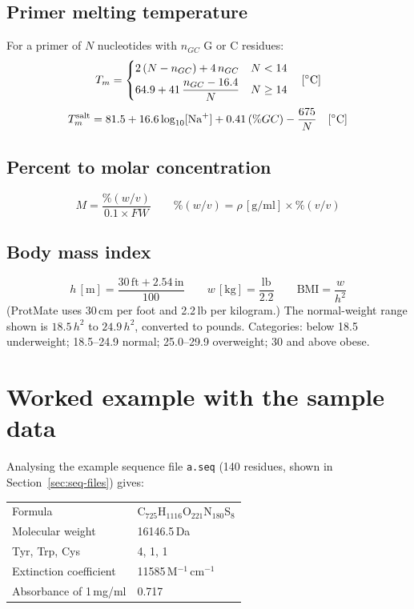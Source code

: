 \documentclass[11pt,a4paper,oneside]{report}
\newcommand{\cmd}[1]{\texttt{#1}}            %
\newcommand{\degC}{\ensuremath{^{\circ}}C}
\begin{document}
\section{Primer melting temperature}
For a primer of $N$ nucleotides with $n_{GC}$ G or C residues:
\[
  T_m = \begin{cases}
     2\,(N - n_{GC}) + 4\,n_{GC} & N < 14\\[2pt]
     64.9 + 41\,\dfrac{n_{GC} - 16.4}{N} & N \ge 14
  \end{cases}\quad[\text{\degC}]
\]
\[
  T_m^\text{salt} = 81.5 + 16.6\log_{10}[\text{Na}^+] + 0.41\,(\%GC) - \frac{675}{N}\quad[\text{\degC}]
\]

\section{Percent to molar concentration}
\[
  M = \frac{\%(w/v)}{0.1\times FW}
  \qquad
  \%(w/v) = \rho\,[\text{g/ml}]\times\%(v/v)
\]

\section{Body mass index}
\[
  h\,[\text{m}] = \frac{30\,\text{ft} + 2.54\,\text{in}}{100}
  \qquad
  w\,[\text{kg}] = \frac{\text{lb}}{2.2}
  \qquad
  \text{BMI} = \frac{w}{h^2}
\]
(ProtMate uses 30\,cm per foot and 2.2\,lb per kilogram.) The normal-weight range shown is
$18.5\,h^2$ to $24.9\,h^2$, converted to pounds. Categories: below 18.5 underweight; 18.5--24.9
normal; 25.0--29.9 overweight; 30 and above obese.

\chapter{Worked example with the sample data}

Analysing the example sequence file \cmd{a.seq} (140 residues,
shown in Section~\ref{sec:seq-files}) gives:

\begin{center}\small
\begin{tabular}{@{}ll@{}}
\toprule
Formula & C$_{725}$H$_{1116}$O$_{221}$N$_{180}$S$_{8}$ \\
Molecular weight & 16146.5\,Da \\
Tyr, Trp, Cys & 4, 1, 1 \\
Extinction coefficient & 11585\,M$^{-1}$\,cm$^{-1}$ \\
Absorbance of 1\,mg/ml & 0.717 \\
\bottomrule
\end{tabular}
\end{center}
\end{document}
